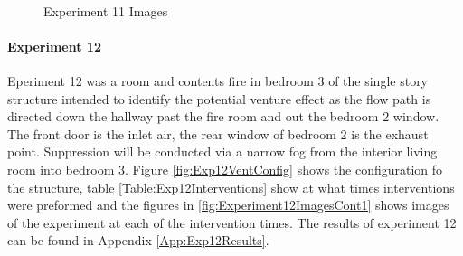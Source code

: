 \documentclass{article}
\begin{document}
\begin{figure}[H]
	\ContinuedFloat 
	\centering 
	 \ 
	 \ 
	\caption{Experiment 11 Images}
	\label{fig:Experiment11ImagesCont3} 
\end{figure}

\paragraph{Experiment 12}\mbox{}

Eperiment 12 was a room and contents fire in bedroom 3 of the single story structure intended to identify the potential venture effect as the flow path is directed down the hallway past the fire room and out the bedroom 2 window. The front door is the inlet air, the rear window of bedroom 2 is the exhaust point. Suppression will be conducted via a narrow fog from the interior living room into bedroom 3. Figure \ref{fig:Exp12VentConfig} shows the configuration fo the structure, table \ref{Table:Exp12Interventions} show at what times interventions were preformed and the figures in \ref{fig:Experiment12ImagesCont1} shows images of the experiment at each of the intervention times. The results of experiment 12 can be found in Appendix \ref{App:Exp12Results}.
\end{document}
